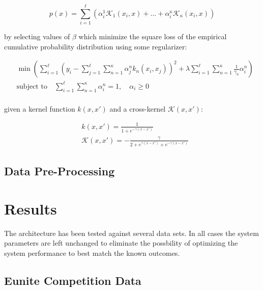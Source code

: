 \documentclass[10pt]{article}
\begin{document}
\begin{equation} \label{eq:SVDensity}
p(x) = \sum_{i=1}^\ell \left( \alpha_i^1 \mathcal{K}_1(x_i,x) + ... + \alpha_i^\kappa \mathcal{K}_\kappa( x_i,x) \right)
\end{equation}

by selecting values of \( \beta \) which minimize the square loss of the empirical cumulative probability distribution using some regularizer:

\begin{align}
&\min \left( \sum_{i=1}^\ell \left( y_i - \sum_{j=1}^\ell \sum_{n=1}^\kappa \alpha_j^n k_n(x_i, x_j) \right)^2 + \lambda \sum_{i=1}^\ell \sum_{n=1}^\kappa \frac{1}{\gamma_n} \alpha_i^n \right) \\
&\text{subject to} \quad \sum_{i=1}^\ell \sum_{n=1}^\kappa \alpha_i^n = 1, \quad \alpha_i \ge 0 \\
\end{align}

given a kernel function \( k(x,x') \) and a cross-kernel \( \mathcal{K}(x,x') \):

\begin{align}
&k(x,x') = \frac{1}{1+e^{-\gamma(x-x')} } \\
&\mathcal{K}(x,x') = -\frac{\gamma}{2 + e^{\gamma(x-x')} + e^{-\gamma(x-x')} } 
\end{align}


\subsection{Data Pre-Processing}




\section{Results}
The architecture has been tested against several data sets.  In all cases the system parameters are left unchanged to eliminate the possbility of optimizing the system performance to best match the known outcomes.

\subsection{Eunite Competition Data}
\end{document}
